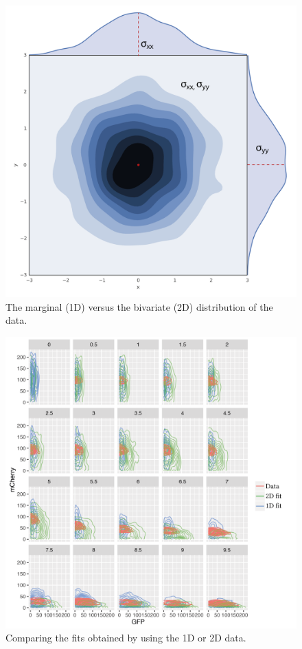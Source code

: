 \begin{figure}[htbp]
\centering
\includegraphics[scale=0.3]{../../chapters/chapterABCFlow/images/normal_sigma_example.png}
\caption[LoF caption]{\label{fig:1d2dsketch} The marginal (1D) versus the bivariate (2D) distribution of the data.}
\end{figure}




\begin{figure}[htbp]
\centering
\includegraphics[scale=0.8]{../../chapters/chapterABCFlow/images/compare_1D_2d.png}
\caption[LoF caption]{\label{fig:1d2dcomp} Comparing the fits obtained by using the 1D or 2D data. }
\end{figure}
\clearpage


